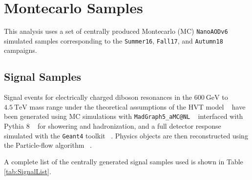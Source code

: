\section{Montecarlo Samples}

This analysis uses a set of centrally produced Montecarlo (MC) \verb|NanoAODv6|
simulated samples corresponding to the \verb|Summer16|, \verb|Fall17|,
and \verb|Autumn18| campaigns.

\subsection {Signal Samples}

Signal events for electrically charged diboson resonances in the $600~\mathrm{GeV}$
to $4.5~\mathrm{TeV}$ mass range under the theoretical assumptions of the HVT model ~\cite{hvt2014}
have been generated using MC simulations with \verb|MadGraph5_aMC@NL| ~\cite{madgraph}
interfaced with Pythia 8 ~\cite{pythia} for showering and hadronization, and a
full detector response simulated with the \verb|Geant4| toolkit ~\cite{geant4}.
Physics objects are then reconstructed using the Particle-flow
algorithm ~\cite{particleflow}.

A complete list of the centrally generated signal samples used is shown in
Table \ref{tab:SignalList}.

